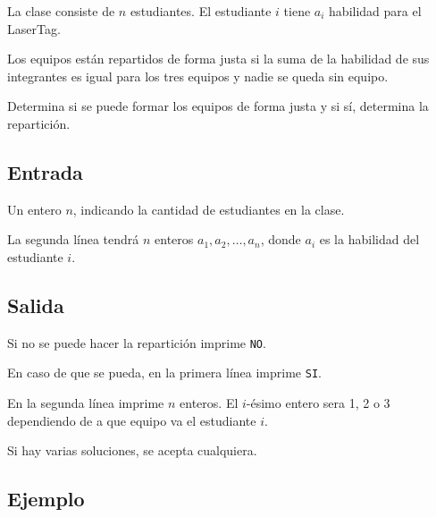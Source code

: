 La clase consiste de \(n\) estudiantes. El estudiante \(i\) tiene \(a_i\) habilidad para el LaserTag. 

Los equipos están repartidos de forma justa si la suma de la habilidad de sus integrantes es igual para los tres equipos y nadie se queda sin equipo.

Determina si se puede formar los equipos de forma justa y si sí, determina la repartición.

\subsection*{Entrada}
Un entero \(n\), indicando la cantidad de estudiantes en la clase.

La segunda línea tendrá \(n\) enteros \(a_1, a_2, \ldots, a_n\), donde \(a_i\) es la habilidad del estudiante \(i\).

\subsection*{Salida}
Si no se puede hacer la repartición imprime \verb|NO|.

En caso de que se pueda, en la primera línea imprime \verb|SI|.

En la segunda línea imprime \(n\) enteros. El \(i\)-ésimo entero sera 1, 2 o 3 dependiendo de a que equipo va el estudiante \(i\). 

Si hay varias soluciones, se acepta cualquiera.

\subsection*{Ejemplo}
\begin{casebox3}
\end{casebox3}

